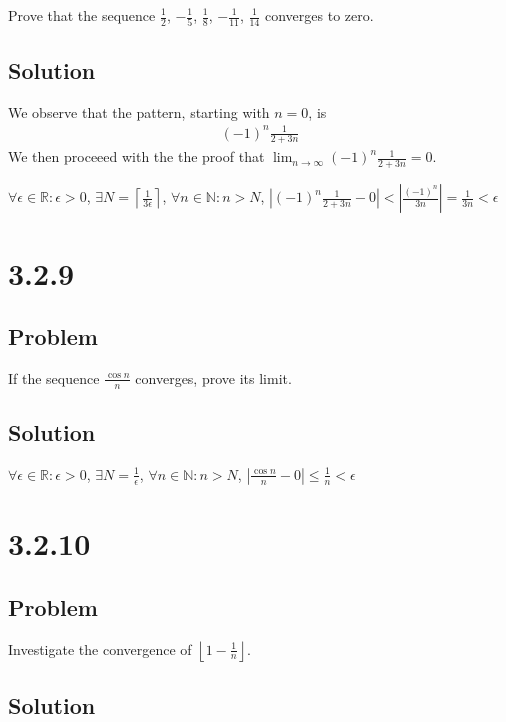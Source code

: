 \documentclass[12pt]{article}
\newcommand{\abs}  [1]{\left|       #1 \right|      }
\newcommand{\floor}[1]{\left\lfloor #1 \right\rfloor}
\newcommand{\ceil} [1]{\left\lceil  #1 \right\rceil }
\newcommand{\R}    [0]{\mathbb{R}                   }
\newcommand{\N}    [0]{\mathbb{N}                   }
\begin{document}
Prove that the sequence $\frac{1}{2}$, $-\frac{1}{5}$, $\frac{1}{8}$, $-\frac{1}{11}$, $\frac{1}{14}$ converges to zero.

\subsection*{Solution}

We observe that the pattern, starting with $n = 0$, is
\begin{align*}
    (-1)^n \frac{1}{2 + 3n}
\end{align*}
We then proceeed with the the proof that $\lim_{n \to \infty} (-1)^n \frac{1}{2 + 3n} = 0$.

$\forall \epsilon \in \R : \epsilon > 0$, $\exists N = \ceil{\frac{1}{3 \epsilon}}$, $\forall n \in \N : n > N$, $\abs{(-1)^n \frac{1}{2 + 3n} - 0} < \abs{\frac{(-1)^n}{3n}} = \frac{1}{3n} < \epsilon$



\section*{3.2.9}

\subsection*{Problem}

If the sequence $\frac{\cos n}{n}$ converges, prove its limit.

\subsection*{Solution}

$\forall \epsilon \in \R : \epsilon > 0$, $\exists N = \frac{1}{\epsilon}$, $\forall n \in \N : n > N$, $\abs{\frac{\cos n}{n} - 0} \leq \frac{1}{n} < \epsilon$



\section*{3.2.10}

\subsection*{Problem}

Investigate the convergence of $\floor{1 - \frac{1}{n}}$.

\subsection*{Solution}
\end{document}
